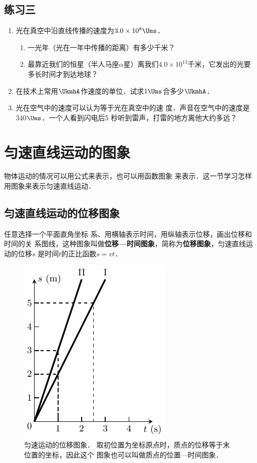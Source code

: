 \subsection*{练习三}

\begin{enumerate}
    \item 光在真空中沿直线传播的速度为$3.0\times 10^8\Ums$．
\begin{enumerate}
    \item 一光年（光在一年中传播的距离）有多少千米？
    \item 最靠近我们的恒星（半人马座$\alpha$星）离我们$4.0\times 10^{13}$千米，它发出的光要多长时间才到达地球？
\end{enumerate}    
\item  在技术上常用$\UkmhA$作速度的单位．试求$1 \Ums$合多少$\UkmhA$．
\item 光在空气中的速度可以认为等于光在真空中的速
度．声音在空气中的速度是340$\Ums$．一个人看到闪电后5
秒听到雷声，打雷的地方离他大约多远？

\end{enumerate}

\section{匀速直线运动的图象}
    物体运动的情况可以用公式来表示，也可以用函数图象
来表示．这一节学习怎样用图象来表示匀速直线运动．

    \subsection{匀速直线运动的位移图象} 
    
    任意选择一个平面直角坐标
系、用横轴表示时间，用纵轴表示位移，画出位移和时间的关
系图线，这种图象叫做\textbf{位移—时间图象}，简称为\textbf{位移图象}，匀速直线运动的位移$s$
是时间$t$的正比函数$s=vt$．
\begin{figure}[htp]
    \centering
    \includegraphics{fig/A/2-8.pdf}
    \caption{匀速运动的位移图象．
    取初位置为坐标原点时，质点的位移等于末位置的坐标，因此这个
    图象也可以叫做质点的位置—时间图象．}\label{fig_A_2-8}
\end{figure}

